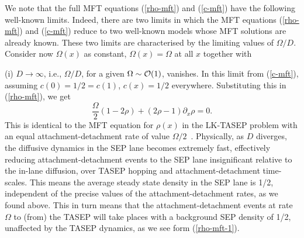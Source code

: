 \documentclass[aps,pre,twocolumn,superscriptaddress,amsmath,amssymb,longbibliography,floatfix,nofootinbib]{revtex4}
\begin{document}

 

We note that the full MFT equations (\ref{rho-mft}) and (\ref{c-mft}) have the following well-known limits. %
{Indeed, there are two limits in which the MFT equations (\ref{rho-mft}) and 
(\ref{c-mft}) reduce to two well-known models whose MFT solutions are already known.}  These two limits are characterised by the limiting values of  $\Omega/D$.
 Consider now $\Omega(x)$ as constant, $\Omega(x)=\Omega$ at all $x$ together with

(i) $D\rightarrow \infty$, i.e., $\Omega/D$, for a given $\Omega\sim {\cal O}(1)$, vanishes. In this limit from (\ref{c-mft}), assuming $c(0)=1/2=c(1)$, $c(x)=1/2$ everywhere. Substituting this in (\ref{rho-mft}), we get
\begin{equation}
    \frac{\Omega}{2}(1-2\rho)+(2\rho-1)\partial_x\rho =0.\label{rho-mft-1}
\end{equation}
This is identical to the MFT equation for $\rho(x)$ in the LK-TASEP problem with an equal attachment-detachment rate of value $\Omega/2$~\cite{frey-2lane}. Physically, as $D$ diverges, the diffusive dynamics in the SEP lane becomes extremely fast, effectively reducing 
attachment-detachment events to the SEP lane insignificant relative to the in-lane diffusion, over TASEP hopping and attachment-detachment time-scales. This means the average steady state density in the SEP lane is 1/2, independent of the precise values of the attachment-detachment rates, as we found above. This in turn means that the attachment-detachment events at rate $\Omega$ to (from) the TASEP will take places with a background SEP density of 1/2, unaffected by the TASEP dynamics, as we see form (\ref{rho-mft-1}).
\end{document}
